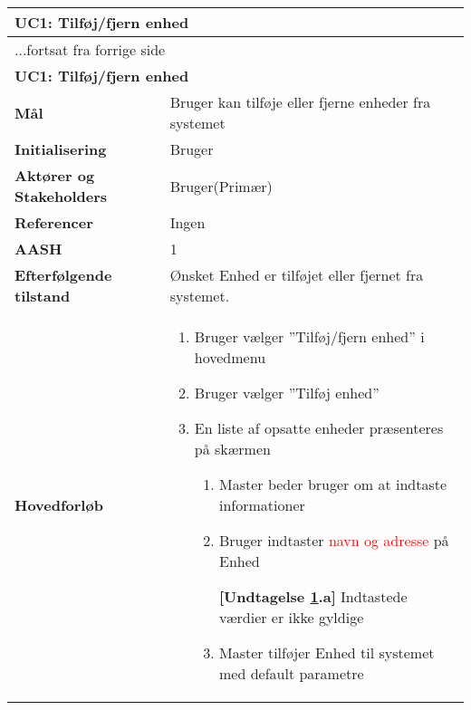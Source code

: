 \begin{center} \centering \label{UC1}
	\begin{longtable}{|p{5cm}|p{9cm}|}  %
	\hline
		\multicolumn{2}{|l|}{\textbf{UC1: Tilføj\slash fjern enhed}} \\\hline %
		\endfirsthead
		
		\multicolumn{2}{l}{...fortsat fra forrige side} \\ \hline %
		\multicolumn{2}{|l|}{\textbf{UC1: Tilføj\slash fjern enhed}} \\\hline %
		\endhead	
		
		\textbf{Mål}								&Bruger kan tilføje eller fjerne enheder fra systemet			\\\hline
		\textbf{Initialisering}					&Bruger														\\\hline
		\textbf{Aktører og Stakeholders}			&Bruger(Primær)												\\\hline 
		\textbf{Referencer}						&Ingen														\\\hline
		\textbf{AASH}							&1															\\\hline
		\textbf{Efterfølgende tilstand}			&Ønsket Enhed er tilføjet eller fjernet fra systemet.		\\\hline
		\textbf{Hovedforløb}					
			&\begin{enumerate}
	
				\item Bruger vælger ''Tilføj/fjern enhed'' i hovedmenu
				
				\item \label{uc1valg} Bruger vælger ''Tilføj enhed''
				
				\item En liste af opsatte enheder præsenteres på skærmen				
				
				\begin{enumerate}
					\item \label{uc1indtast} Master beder bruger om at indtaste informationer
					
					\item \label{uc1indtast_fejl} Bruger indtaster \textcolor{red}{navn og adresse} på Enhed
					
						\textbf{[Undtagelse \ref{uc1indtast_fejl}.a]} \newline
						Indtastede værdier er ikke gyldige
					
					\item Master tilføjer Enhed til systemet med default parametre
					

\end{enumerate}
\end{enumerate}
\end{longtable}
\end{center}
